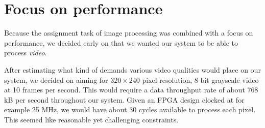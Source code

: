 \section{Focus on performance}

Because the assignment task of image processing was combined with a
focus on performance, we decided early on that we wanted our system to
be able to process \emph{video}.

After estimating what kind of demands various video qualities would
place on our system, we decided on aiming for $320\times240$ pixel
resolution, 8 bit grayscale video at 10 frames per second. This would
require a data throughput rate of about 768 kB per second throughout our
system. Given an FPGA design clocked at for example 25 MHz, we would
have about 30 cycles available to process each pixel. This seemed
like reasonable yet challenging constraints.
